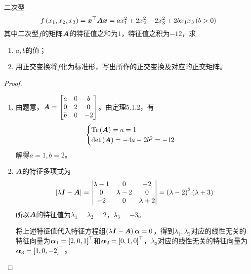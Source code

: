 \begin{problem}
二次型
\begin{equation*}
    f\left( x_1,x_2,x_3 \right)=\boldsymbol{x}^\top\boldsymbol{A}\boldsymbol{x}=ax_1^2+2x_2^2-2x_3^2+2bx_1x_3\left( b>0 \right)
\end{equation*}
其中二次型\(f\)的矩阵\(\boldsymbol{A}\)的特征值之和为\(1\)，特征值之积为\(-12\)，求
\begin{enumerate}
    \item \(a,b\)的值；
    \item 用正交变换将\(f\)化为标准形，写出所作的正交变换及对应的正交矩阵。
\end{enumerate}
\end{problem}
\begin{proof}
    \begin{enumerate}
        \item {
              由题意，\(\boldsymbol{A}=\begin{bmatrix}a&0&b\\0&2&0\\b&0&-2\end{bmatrix}\)。由定理5.1.2，有
              \begin{equation*}
                  \begin{cases}
                      \mathrm{Tr}\left( \boldsymbol{A} \right)=a=1 \\
                      \mathrm{det}\left( \boldsymbol{A} \right)=-4a-2b^2=-12
                  \end{cases}
              \end{equation*}
              解得\(a=1,b=2\)。
              }
        \item {
              \(\boldsymbol{A}\)的特征多项式为
              \begin{equation*}
                  \left|\lambda\boldsymbol{I}-\boldsymbol{A} \right|=\begin{vmatrix}\lambda-1&0&-2\\0&\lambda-2&0\\-2&0&\lambda+2\end{vmatrix}=\left( \lambda-2 \right)^2\left( \lambda+3 \right)
              \end{equation*}
              所以\(\boldsymbol{A}\)的特征值为\(\lambda_1=\lambda_2=2\)，\(\lambda_3=-3\)。

              将上述特征值代入特征方程组\(\left( \lambda\boldsymbol{I}-\boldsymbol{A} \right)\boldsymbol{\alpha}=0\)，得到\(\lambda_1,\lambda_2\)对应的线性无关的特征向量为\(\boldsymbol{\alpha}_1=\left[ 2,0,1 \right]^\top\)和\(\boldsymbol{\alpha}_2=\left[ 0,1,0 \right]^\top\)，\(\lambda_3\)对应的线性无关的特征向量为\(\boldsymbol{\alpha}_3=\left[ 1,0,-2 \right]^\top\)。

}
\end{enumerate}
\end{proof}
